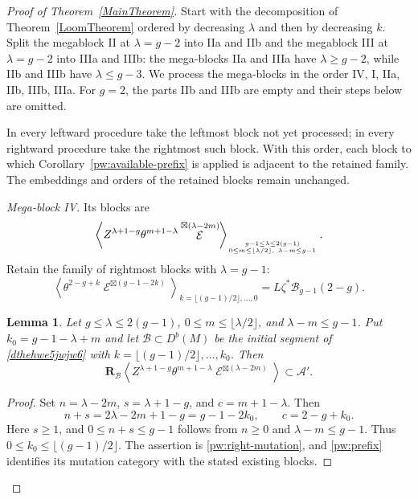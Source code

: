 \documentclass[10pt,a4paper]{amsart}
\newtheorem{lemma}{Lemma}
\DeclareMathOperator{\cE}{\mathcal{E}}
\begin{document}
\begin{proof}[Proof of Theorem~\ref{MainTheorem}]
Start with the  decomposition of Theorem~\ref{LoomTheorem}
ordered by decreasing $\lambda$ and then by decreasing $k$.  
Split the megablock II at
$\lambda=g-2$ into IIa and IIb and the megablock III at $\lambda=g-2$ into IIIa and IIIb: the mega-blocks
IIa and IIIa have $\lambda\geq g-2$, while IIb and IIIb have
$\lambda\leq g-3$.  We process the mega-blocks in the order
IV, I, IIa, IIb, IIIb, IIIa.
For $g=2$, the parts IIb and IIIb are empty and their steps below are omitted.

In every leftward procedure take the leftmost block not yet processed;
in every rightward procedure take the rightmost such block.
With this order, each block to which Corollary~\ref{pw:available-prefix}
is applied is adjacent to the retained family. The embeddings and
orders of the retained blocks remain unchanged.


\smallskip
\noindent\textit{Mega-block IV.}
Its blocks are
\begin{equation}\label{sRGSRGDRH}
 \left\langle Z^{\lambda+1-g}\theta^{m+1-\lambda}
       \cE^{\boxtimes(\lambda-2m)}\right\rangle_{{g-1\leq\lambda\leq2(g-1)}\atop
       {0\leq m\leq\lfloor\lambda/2\rfloor,\ \lambda-m\leq g-1}}.
\end{equation}
Retain the  family of rightmost blocks with $\lambda=g-1$:
\begin{equation}\label{dthehwe5jwjw6}
 \left\langle\theta^{2-g+k}\cE^{\boxtimes(g-1-2k)}
 \right\rangle_{k=\lfloor(g-1)/2\rfloor,\ldots,0}
       =L\zeta^*\mathcal B_{g-1}(2-g).
\end{equation}

\begin{lemma}\label{megablockiv}
Let $g\leq\lambda\leq2(g-1)$,
$0\leq m\leq\lfloor\lambda/2\rfloor$, and $\lambda-m\leq g-1$.
Put $k_0=g-1-\lambda+m$ and let $\mathcal B\subset D^b(M)$ be the
initial segment of \eqref{dthehwe5jwjw6} with
$
 k=\lfloor(g-1)/2\rfloor,\ldots,k_0$.
Then
\[
 \mathbf R_{\mathcal B}
 \left\langle Z^{\lambda+1-g}\theta^{m+1-\lambda}
       \cE^{\boxtimes(\lambda-2m)}\right\rangle
       \subset\mathcal A'.
\]
\end{lemma}

\begin{proof}
Set $n=\lambda-2m$, $s=\lambda+1-g$, and $c=m+1-\lambda$.
Then
\[
 n+s=2\lambda-2m+1-g=g-1-2k_0,\qquad c=2-g+k_0.
\]
Here $s\geq1$, and $0\leq n+s\leq g-1$ follows from $n\geq0$
and $\lambda-m\leq g-1$.  Thus $0\leq k_0\leq\lfloor(g-1)/2\rfloor$.
The assertion is \eqref{pw:right-mutation}, and \eqref{pw:prefix}
identifies its mutation category with the stated existing blocks.
\end{proof}


\end{proof}
\end{document}
